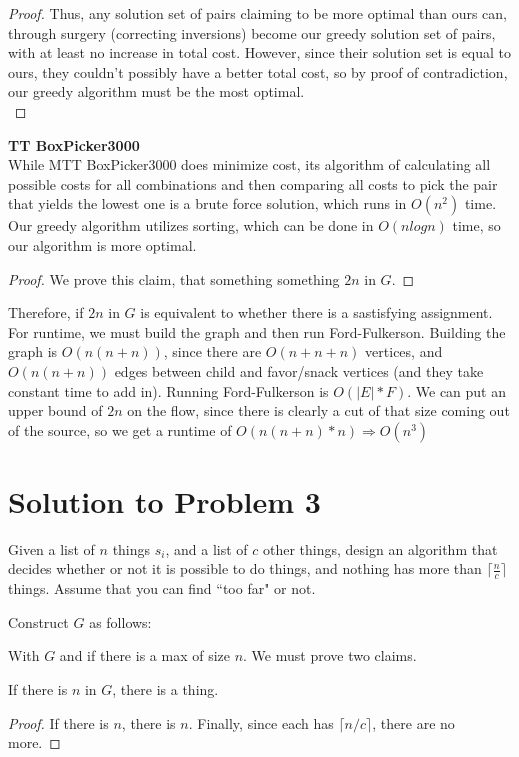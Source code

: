 \documentclass[11pt]{article}
\begin{document}
\begin{proof}
Thus, any solution set of pairs claiming to be more optimal than ours can, through surgery (correcting inversions) become our greedy solution set of pairs, with at least no increase in total cost. However, since their solution set is equal to ours, they couldn't possibly have a better total cost, so by proof of contradiction, our greedy algorithm must be the most optimal.\\
\end{proof}
\textbf{TT BoxPicker3000}\\
While MTT BoxPicker3000 does minimize cost, its algorithm of calculating all possible costs for all combinations and then comparing all costs to pick the pair that yields the lowest one is a brute force solution, which runs in $O(n^2)$ time. Our greedy algorithm utilizes sorting, which can be done in $O(nlogn)$ time, so our algorithm is more optimal.
\newpage

\begin{proof}
We prove this claim, that something something $2n$ in $G$.
\end{proof}
Therefore, if $2n$ in $G$ is equivalent to whether there is a sastisfying assignment. For runtime, we must build the graph and then run Ford-Fulkerson. Building the graph is $O(n(n+n))$, since there are $O(n+n+n)$ vertices, and $O(n(n+n))$ edges between child and favor/snack vertices (and they take constant time to add in). Running Ford-Fulkerson is $O(|E|*F)$. We can put an upper bound of $2n$ on the flow, since there is clearly a cut of that size coming out of the source, so we get a runtime of $O(n(n+n) * n) \Rightarrow O(n^{3})$

\newpage

\section*{Solution to Problem 3}



Given a list of $n$ things $s_i$, and a list of $c$ other things, design an algorithm that decides whether or not it is possible to do things, and nothing has more than $\lceil \frac{n}{c} \rceil$ things. Assume that you can find ``too far" or not.

Construct $G$ as follows:


With $G$ and if there is a max of size $n$. We must prove two claims.
\begin{claim} 
If there is $n$ in $G$, there is a thing. 
\end{claim}
\begin{proof}
If there is $n$, there is $n$. Finally, since each has $\lceil n/c \rceil$, there are no more.
\end{proof}
\end{document}
